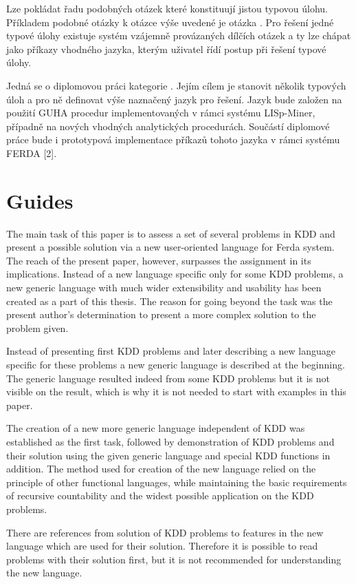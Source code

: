 \documentclass[a4paper,12pt]{book}
\begin{document}
Lze pokládat řadu podobných otázek které konstituují jistou typovou úlohu. Příkladem podobné otázky k otázce výše uvedené je otázka . Pro řešení jedné typové úlohy existuje systém vzájemně provázaných dílčích otázek a ty lze chápat jako příkazy vhodného jazyka, kterým uživatel řídí postup při řešení typové úlohy.

Jedná se o diplomovou práci kategorie . Jejím cílem je stanovit několik typových úloh a pro ně definovat výše naznačený jazyk pro řešení. Jazyk bude založen na použití GUHA procedur implementovaných v rámci systému LISp-Miner, případně na nových vhodných analytických procedurách. Součástí diplomové práce bude i prototypová implementace příkazů tohoto jazyka v rámci systému FERDA [2].

\section*{Guides}
The main task of this paper is to assess a set of several problems in KDD and present a possible solution via a new user-oriented language for Ferda system. The reach of the present paper, however, surpasses the assignment in its implications. Instead of a new language specific only for some KDD problems, a new generic language with much wider extensibility and usability has been created as a part of this thesis. The reason for going beyond the task was the present author's determination to present a more complex solution to the problem given. 

Instead of presenting first KDD problems and later describing a new language specific for these problems a new generic language is described at the beginning. The generic language resulted indeed from some KDD problems but it is not visible on the result, which is why it is not needed to start with examples in this paper.

The creation of a new more generic language independent of KDD was established as the first task, followed by demonstration of KDD problems and their solution using the given generic language and special KDD functions in addition. The method used for creation of the new language relied on the principle of other functional languages, while maintaining the basic requirements of recursive countability and the widest possible application on the KDD problems.

There are references from solution of KDD problems to features in the new language which are used for their solution. Therefore it is possible to read problems with their solution first, but it is not recommended for understanding the new language.
\end{document}
